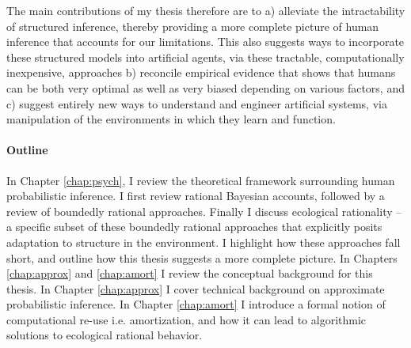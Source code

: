 The main contributions of my thesis therefore are to a) alleviate the intractability of structured inference, thereby providing a more complete picture of human inference that accounts for our limitations. This also suggests ways to incorporate these structured models into artificial agents, via these tractable, computationally inexpensive, approaches  b) reconcile empirical evidence that shows that humans can be both very optimal as well as very biased depending on various factors, and c) suggest entirely new ways to understand and engineer artificial systems, via manipulation of the environments in which they learn and function.

\paragraph{Outline}

In Chapter \ref{chap:psych}, I review the theoretical framework surrounding human probabilistic inference. I first review rational Bayesian accounts, followed by a review of boundedly rational approaches. Finally I discuss ecological rationality -- a specific subset of these boundedly rational approaches that explicitly posits adaptation to structure in the environment. I highlight how these approaches fall short, and outline how this thesis suggests a more complete picture. In Chapters \ref{chap:approx} and \ref{chap:amort} I review the conceptual background for this thesis. In Chapter \ref{chap:approx} I cover technical background on approximate probabilistic inference. In Chapter \ref{chap:amort} I introduce a formal notion of computational re-use i.e. amortization, and how it can lead to algorithmic solutions to ecological rational behavior.


